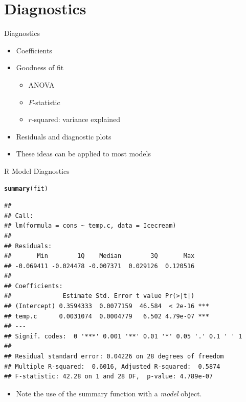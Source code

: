 \documentclass[aspectratio=169]{beamer}\usepackage[]{graphicx}\usepackage[]{color}
\makeatletter
\newcommand{\hlstd}[1]{\textcolor[rgb]{0.345,0.345,0.345}{#1}}%
\newcommand{\hlkwd}[1]{\textcolor[rgb]{0.737,0.353,0.396}{\textbf{#1}}}%
\newenvironment{kframe}{%
 \def\at@end@of@kframe{}%
 \ifinner\ifhmode%
  \def\at@end@of@kframe{\end{minipage}}%
  \begin{minipage}{\columnwidth}%
 \fi\fi%
 \def\FrameCommand##1{\hskip\@totalleftmargin \hskip-\fboxsep
 \colorbox{shadecolor}{##1}\hskip-\fboxsep
     \hskip-\linewidth \hskip-\@totalleftmargin \hskip\columnwidth}%
 \MakeFramed {\advance\hsize-\width
   \@totalleftmargin\z@ \linewidth\hsize
   \@setminipage}}%
 {\par\unskip\endMakeFramed%
 \at@end@of@kframe}
\newenvironment{knitrout}{}{} %
\makeatother
\begin{document}
\section{Diagnostics}
\begin{frame}{Diagnostics}
\begin{itemize}
  \item Coefficients
  \item Goodness of fit
	\begin{itemize}
		\item ANOVA
		\item $F$-statistic
		\item $r$-squared: variance explained
	\end{itemize}
	\item Residuals and diagnostic plots
	\item These ideas can be applied to most models
\end{itemize}
\end{frame}

\begin{frame}[fragile]{R Model Diagnostics}
\begin{knitrout}\scriptsize
{}\color{fgcolor}\begin{kframe}
\begin{alltt}
\hlkwd{summary}\hlstd{(fit)}
\end{alltt}
\begin{verbatim}
## 
## Call:
## lm(formula = cons ~ temp.c, data = Icecream)
## 
## Residuals:
##       Min        1Q    Median        3Q       Max 
## -0.069411 -0.024478 -0.007371  0.029126  0.120516 
## 
## Coefficients:
##              Estimate Std. Error t value Pr(>|t|)    
## (Intercept) 0.3594333  0.0077159  46.584  < 2e-16 ***
## temp.c      0.0031074  0.0004779   6.502 4.79e-07 ***
## ---
## Signif. codes:  0 '***' 0.001 '**' 0.01 '*' 0.05 '.' 0.1 ' ' 1
## 
## Residual standard error: 0.04226 on 28 degrees of freedom
## Multiple R-squared:  0.6016,	Adjusted R-squared:  0.5874 
## F-statistic: 42.28 on 1 and 28 DF,  p-value: 4.789e-07
\end{verbatim}
\end{kframe}
\end{knitrout}
\begin{itemize}
\item Note the use of the summary function with a \emph{model} object. 
\end{itemize}
\end{frame}
\end{document}
